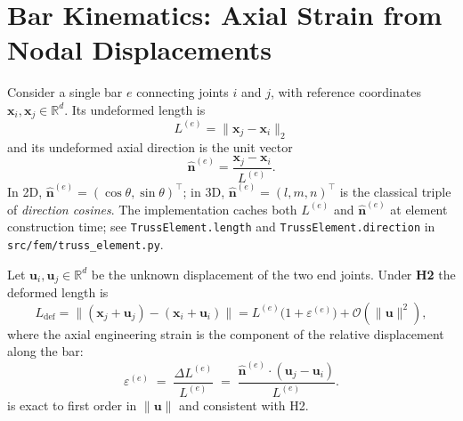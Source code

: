 \section{Bar Kinematics: Axial Strain from Nodal Displacements}
\label{app:fem:kinematics}

Consider a single bar $e$ connecting joints $i$ and $j$, with
reference coordinates
$\mathbf{x}_i,\mathbf{x}_j\in\mathbb{R}^d$. Its undeformed length is
\begin{equation}
  L^{(e)} = \|\mathbf{x}_j-\mathbf{x}_i\|_2
\end{equation}
and its undeformed axial direction is the unit vector
\begin{equation}
  \hat{\mathbf{n}}^{(e)}
  = \frac{\mathbf{x}_j-\mathbf{x}_i}{L^{(e)}}.
  \label{eq:direction_cosines}
\end{equation}
In 2D, $\hat{\mathbf{n}}^{(e)}=(\cos\theta,\sin\theta)^\top$; in 3D,
$\hat{\mathbf{n}}^{(e)}=(l,m,n)^\top$ is the classical triple of
\emph{direction cosines}. The implementation caches both $L^{(e)}$
and $\hat{\mathbf{n}}^{(e)}$ at element construction time; see
\texttt{TrussElement.length} and \texttt{TrussElement.direction} in
\texttt{src/fem/truss\_element.py}.

Let $\mathbf{u}_i,\mathbf{u}_j\in\mathbb{R}^d$ be the unknown
displacement of the two end joints. Under \textbf{H2} the deformed
length is
\begin{equation}
  L_{\mathrm{def}}
  = \bigl\|(\mathbf{x}_j+\mathbf{u}_j)-(\mathbf{x}_i+\mathbf{u}_i)\bigr\|
  = L^{(e)}\bigl(1+\varepsilon^{(e)}\bigr)+\mathcal{O}(\|\mathbf{u}\|^2),
\end{equation}
where the axial engineering strain is the component of the relative
displacement along the bar:
\begin{equation}
  \varepsilon^{(e)}
  \;=\;\frac{\Delta L^{(e)}}{L^{(e)}}
  \;=\;\frac{\hat{\mathbf{n}}^{(e)}\cdot(\mathbf{u}_j-\mathbf{u}_i)}
             {L^{(e)}}.
  \label{eq:axial_strain}
\end{equation}
 is exact to first order in $\|\mathbf{u}\|$
and consistent with H2.

